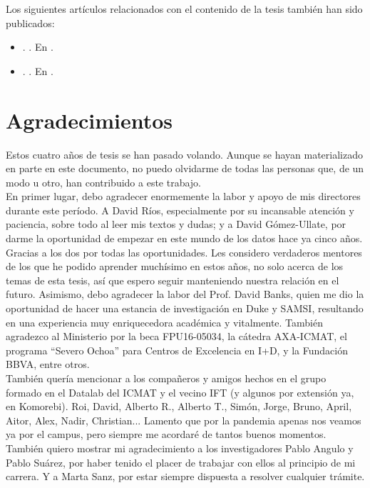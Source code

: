 \documentclass[a4paper, 11pt, openright, twoside]{reportPhD}
\numberwithin{figure}{chapter}
\numberwithin{table}{chapter}
\numberwithin{equation}{chapter}
\begin{document}
Los siguientes artículos relacionados con el contenido de la tesis también han sido publicados:
\begin{itemize}
    \item \cite{angulo2018bayesian}. . En .
    \item \cite{banks2020adversarial}. . En .
\end{itemize}


\chapter*{Agradecimientos}

Estos cuatro años de tesis se han pasado volando. Aunque se hayan materializado en parte en este documento, no puedo olvidarme de todas las personas que, de un modo u otro, han contribuido a este trabajo. \\

En primer lugar, debo agradecer enormemente la labor y apoyo de mis directores durante este período. A David Ríos, especialmente por su incansable atención y paciencia, sobre todo al leer mis textos y dudas; y a David Gómez-Ullate, por darme la oportunidad de empezar en este mundo de los datos hace ya cinco años. Gracias a los dos por todas las oportunidades. Les considero verdaderos mentores de los que he podido aprender muchísimo en estos años, no solo acerca de los temas de esta tesis, así que espero seguir manteniendo nuestra relación en el futuro. 
Asimismo, debo agradecer la labor del Prof. David Banks, quien me dio la oportunidad de hacer una estancia de investigación en Duke y SAMSI, resultando en una experiencia muy enriquecedora académica y vitalmente. También agradezco al Ministerio por la beca FPU16-05034, la cátedra AXA-ICMAT, el programa “Severo Ochoa”
para Centros de Excelencia en I+D, y la Fundación BBVA, entre otros. \\

También quería mencionar a los compañeros y amigos hechos en el grupo formado en el Datalab del ICMAT y el vecino IFT (y algunos por extensión ya, en Komorebi). Roi, David, Alberto R., Alberto T., Simón, Jorge, Bruno, April, Aitor, Alex, Nadir, Christian... 
Lamento que por la pandemia apenas nos veamos ya por el campus, pero siempre me acordaré de tantos buenos momentos. También quiero mostrar mi agradecimiento a los investigadores Pablo Angulo y Pablo Suárez, por haber tenido el placer de trabajar con ellos al principio de mi carrera. Y a Marta Sanz, por estar siempre dispuesta a resolver cualquier trámite. \\
\end{document}
